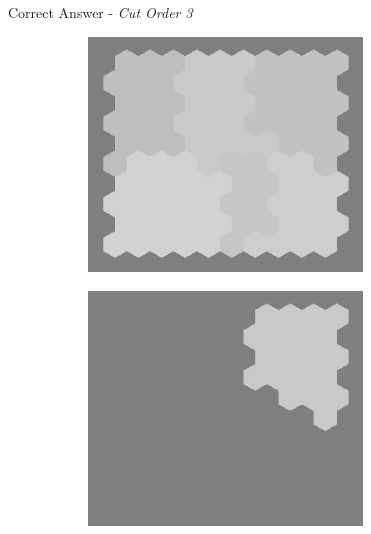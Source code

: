 \documentclass[10pt,xcolor=svgnames]{beamer} %
\begin{document}
\begin{frame}[standout]{Correct Answer - \textit{Cut Order 3}}
    \begin{figure}
        \centering
        \begin{subfigure}{0.4\textwidth}
        \centering
            \includegraphics[width=0.8\textwidth]{pictures/grid_init4.png}
        \end{subfigure}
        \hfill
        \begin{subfigure}{0.4\textwidth}
            \centering
            \includegraphics[width=0.8\textwidth]{pictures/seg_7_cut3.png}
        \end{subfigure}
    \end{figure}
\end{frame}
\end{document}
